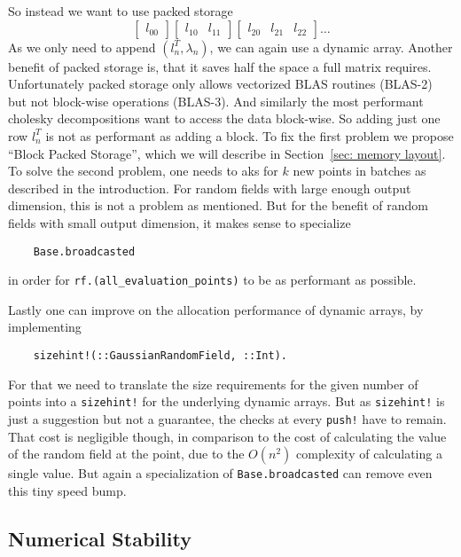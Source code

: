 So instead we want to use packed storage
\[
	\begin{bmatrix}
		l_{00}	
	\end{bmatrix}
	\begin{bmatrix}
		l_{10} & l_{11}
	\end{bmatrix}
	\begin{bmatrix}
		l_{20} & l_{21} & l_{22}
	\end{bmatrix}
	\dots
\]
As we only need to append \((l_n^T, \lambda_n)\), we can again use a dynamic
array. Another benefit of packed storage is, that it saves half the space a
full matrix requires. Unfortunately packed storage only allows vectorized BLAS routines
(BLAS-2) but not block-wise operations (BLAS-3). And similarly the most performant
cholesky decompositions want to access the data block-wise. So adding just one
row \(l_n^T\) is not as performant as adding a block. To fix the first problem
we propose ``Block Packed Storage'', which we will describe in Section~\ref{sec: memory
layout}. To solve the second problem, one needs to aks for \(k\) new points in
batches as described in the introduction. For random fields with large enough
output dimension, this is not a problem as mentioned. But for the benefit of
random fields with small output dimension, it makes sense to specialize
\begin{verbatim}
	Base.broadcasted
\end{verbatim}
in order for \texttt{rf.(all_evaluation_points)} to be as performant
as possible.

Lastly one can improve on the allocation performance of dynamic arrays, by implementing
\begin{verbatim}
	sizehint!(::GaussianRandomField, ::Int).
\end{verbatim}
For that we need to translate the size requirements for the given number of
points into a \texttt{sizehint!} for the underlying dynamic arrays.
But as \texttt{sizehint!} is just a suggestion but not a guarantee,
the checks at every \texttt{push!} have to remain. That
cost is negligible though, in comparison to the cost of calculating the
value of the random field at the point, due to the \(O(n^2)\) complexity of
calculating a single value. But again a specialization of
\texttt{Base.broadcasted} can remove even this tiny speed bump.

\subsection{Numerical Stability}

